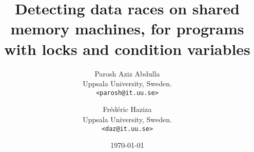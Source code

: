 \usepackage[english]{babel}
\usepackage[utf8]{inputenc}

\usepackage[T1]{fontenc}



\title{Detecting data races on shared memory machines, for programs with locks and condition variables}


\author{
Parosh Aziz Abdulla\\%
Uppsala University, Sweden.\\%
\texttt{<parosh@it.uu.se>}
\and%
Fr\'ed\'eric Haziza \\%
Uppsala University, Sweden.\\%
\texttt{<daz@it.uu.se>}
}

\date{\today}


\usepackage[version=latest]{pgf}
\usepackage{tikz}
\usetikzlibrary{%
  arrows,%
  calc,%
  calendar,%
  fit,%
  shapes,%
  shapes.geometric,%
  shapes.misc,%
  shapes.symbols,%
  shapes.arrows,%
  shapes.callouts,%
  shapes.multipart,%
  backgrounds,%
  matrix,%
  fadings,%
  through,%
  positioning,%
  scopes,%
  decorations.shapes,%
  decorations.pathmorphing,%
  decorations.text,%
  shadows,%
  trees,%
  snakes%
}
